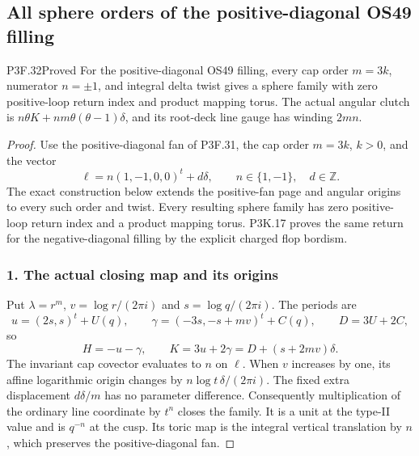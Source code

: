 \subsection{All sphere orders of the positive-diagonal OS49 filling}
\begin{statement}{P3F.32}{Proved}
For the positive-diagonal OS49 filling, every cap order $m=3k$, numerator $n=\pm1$, and integral delta twist gives a sphere family with zero positive-loop return index and product mapping torus. The actual angular clutch is $n\theta K+nm\theta(\theta-1)\delta$, and its root-deck line gauge has winding $2mn$.
\end{statement}
\begin{proof}
Use the positive-diagonal fan of P3F.31, the cap order \(m=3k\), \(k>0\), and the vector \[
 \ell=n(1,-1,0,0)^t+d\delta,\qquad n\in\{1,-1\},\quad d\in\mathbb Z.
\] The exact construction below extends the positive-fan page and angular origins to every such order and twist. Every resulting sphere family has zero positive-loop return index and a product mapping torus. P3K.17 proves the same return for the negative-diagonal filling by the explicit charged flop bordism.

\subsubsection{1. The actual closing map and its origins}\label{the-actual-closing-map-and-its-origins}

Put \(\lambda=r^m\), \(v=\log r/(2\pi i)\) and \(s=\log q/(2\pi i)\). The periods are \[
 u=(2s,s)^t+U(q),\qquad
 \gamma=(-3s,-s+mv)^t+C(q),\qquad D=3U+2C,
\] so \[
 H=-u-\gamma,\qquad K=3u+2\gamma=D+(s+2mv)\delta.
\] The invariant cap covector evaluates to \(n\) on \(\ell\). When \(v\) increases by one, its affine logarithmic origin changes by \(n\log t\,\delta/(2\pi i)\). The fixed extra displacement \(d\delta/m\) has no parameter difference. Consequently multiplication of the ordinary line coordinate by \(t^n\) closes the family. It is a unit at the type-II value and is \(q^{-n}\) at the cusp. Its toric map is the integral vertical translation by \(n\), which preserves the positive-diagonal fan.


\end{proof}
